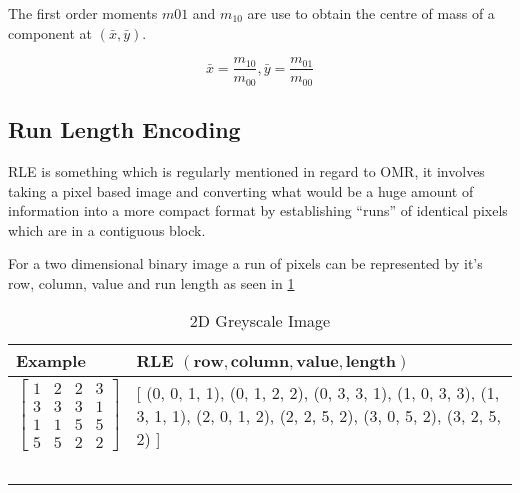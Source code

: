 The first order moments $m{01}$ and $m_{10}$ are use to obtain the centre of mass of a component at $(\bar{x}, \bar{y})$.

\begin{equation}\label{eqn:1-moment-mass}
\bar{x} = \frac{m_{10}}{m_{00}}, \bar{y} = \frac{m_{01}}{m_{00}}
\end{equation}

\subsection{Run Length Encoding}
\label{sec:tb-rle}

\acrfull{RLE} is something which is regularly mentioned in regard to OMR, it involves taking a pixel based image and converting what would be a huge amount of information into a more compact format by establishing ``runs'' of identical pixels which are in a contiguous block.

For a two dimensional binary image a run of pixels can be represented by it's row, column, value and run length \parencite[p. 27-28]{burger2009principles} as seen in \cref{table:rle-2d}

\begin{table}[H]

    \begin{tabularx}{\textwidth}{ X | X }
        \toprule
        Example & RLE $(\textbf{row}, \textbf{column}, \textbf{value}, \textbf{length})$\\
        \midrule

        $$\begin{bmatrix}
        1 & 2 & 2 & 3  \\
        3 & 3 & 3 & 1  \\
        1 & 1 & 5 & 5  \\
        5 & 5 & 2 & 2
        \end{bmatrix}$$

        &
        {[} (0, 0, 1, 1), (0, 1, 2, 2), (0, 3, 3, 1), \newline
        (1, 0, 3, 3), (1, 3, 1, 1), (2, 0, 1, 2), \newline
        (2, 2, 5, 2), (3, 0, 5, 2), (3, 2, 5, 2) {]} \\
        \ & \ \\
    \bottomrule
    \end{tabularx}

    \caption{2D Greyscale Image}
    \label{table:rle-2d}
\end{table}


